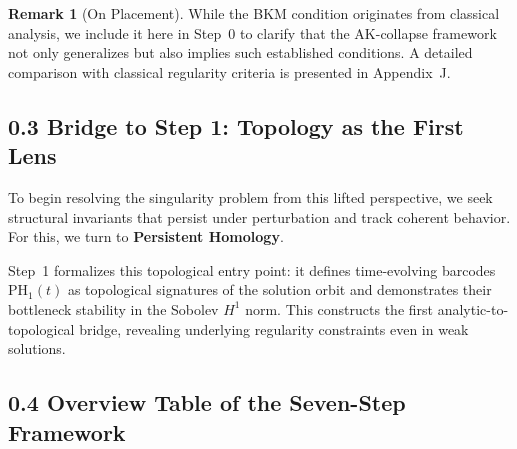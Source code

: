 \documentclass[11pt]{article}
\theoremstyle{definition}
\newtheorem{remark}[theorem]{Remark}
\begin{document}
\begin{remark}[On Placement]
While the BKM condition originates from classical analysis, we include it here in Step~0 to clarify that the AK-collapse framework not only generalizes but also implies such established conditions. A detailed comparison with classical regularity criteria is presented in Appendix~J.
\end{remark}

\subsection*{0.3 Bridge to Step 1: Topology as the First Lens}

To begin resolving the singularity problem from this lifted perspective, we seek structural invariants that persist under perturbation and track coherent behavior. For this, we turn to \textbf{Persistent Homology}.

Step~1 formalizes this topological entry point: it defines time-evolving barcodes \( \mathrm{PH}_1(t) \) as topological signatures of the solution orbit and demonstrates their bottleneck stability in the Sobolev \( H^1 \) norm. This constructs the first analytic-to-topological bridge, revealing underlying regularity constraints even in weak solutions.

\subsection*{0.4 Overview Table of the Seven-Step Framework}
\end{document}
